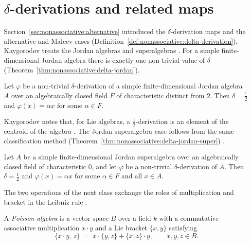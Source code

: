 \section{$\delta$-derivations and related maps}\label{sec:nonassociative:delta-quasi-anti}

Section~\ref{sec:nonassociative:alternative} introduced the
$\delta$-derivation maps and the alternative and Malcev cases
(Definition~\ref{def:nonassociative:delta-derivation}). Kaygorodov
treats the Jordan algebras and superalgebras
\cite{KacKaygorodov2007Delta}. For a simple finite-dimensional Jordan
algebra there is exactly one non-trivial value of $\delta$ (Theorem~\ref{thm:nonassociative:delta-jordan}).

\begin{theorem}
\label{thm:nonassociative:delta-jordan}
Let $\varphi$ be a non-trivial $\delta$-derivation of a simple
finite-dimensional Jordan algebra $A$ over an algebraically closed field
$F$ of characteristic distinct from $2$. Then $\delta=\tfrac12$ and
$\varphi(x)=\alpha x$ for some $\alpha\in F$.
\end{theorem}

Kaygorodov notes that, for Lie algebras, a $\tfrac12$-derivation is an
element of the centroid of the algebra
\cite[Introduction]{KacKaygorodov2007Delta}. The Jordan superalgebra
case follows from the same classification method (Theorem~\ref{thm:nonassociative:delta-jordan-super})
\cite[Theorem~4.4]{KacKaygorodov2007Delta}.\begin{theorem}
\label{thm:nonassociative:delta-jordan-super}
Let $A$ be a simple finite-dimensional Jordan superalgebra over an
algebraically closed field of characteristic $0$, and let $\varphi$ be a
non-trivial $\delta$-derivation of $A$. Then $\delta=\tfrac12$ and
$\varphi(x)=\alpha x$ for some $\alpha\in F$ and all $x\in A$.
\end{theorem}

The two operations of the next class exchange the roles of
multiplication and bracket in the Leibniz rule %
\cite[p.~657]{AlbertiArestiLi2018Poisson}.

\begin{definition}
\label{def:nonassociative:delta-poisson}
A \emph{Poisson algebra} is a vector space $B$ over a field $k$ with a
commutative associative multiplication $x\cdot y$ and a Lie bracket
$\{x,y\}$ satisfying
\[
\{x\cdot y,\,z\}\;=\;x\cdot\{y,z\}+\{x,z\}\cdot y,
\qquad x,y,z\in B.
\]
\end{definition}

